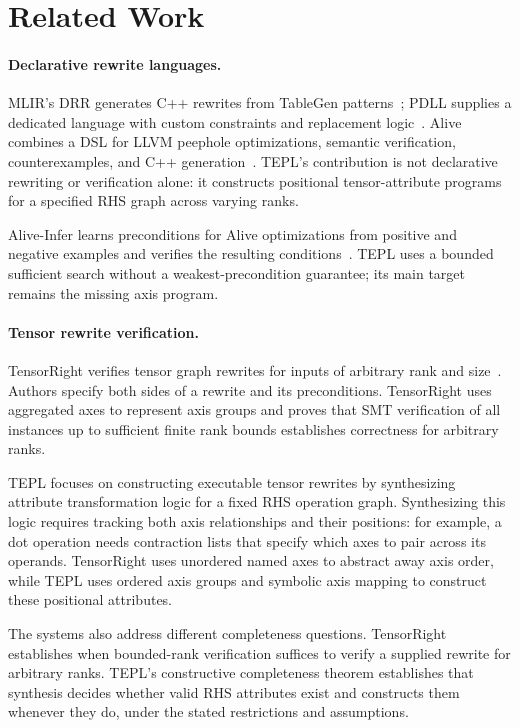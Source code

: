 \section{Related Work}
\label{sec:related-work}

\paragraph{Declarative rewrite languages.}
MLIR's DRR generates C++ rewrites from TableGen patterns~\cite{mlir-drr};
PDLL supplies a dedicated language with custom constraints and replacement
logic~\cite{mlir-pdll}. Alive combines a DSL for LLVM peephole optimizations,
semantic verification, counterexamples, and C++ generation~\cite{alive}.
TEPL's contribution is not declarative rewriting or verification alone:
it constructs positional tensor-attribute programs for a specified RHS
graph across varying ranks.

Alive-Infer learns preconditions for Alive optimizations from positive
and negative examples and verifies the resulting conditions~\cite{alive-infer}.
TEPL uses a bounded sufficient search without a weakest-precondition
guarantee; its main target remains the missing axis program.

\paragraph{Tensor rewrite verification.}
TensorRight verifies tensor graph rewrites for inputs of arbitrary rank and
size~\cite{tensorright}. Authors specify both sides of a rewrite and its
preconditions. TensorRight uses aggregated axes to represent axis groups and
proves that SMT verification of all instances up to sufficient finite rank
bounds establishes correctness for arbitrary ranks.

TEPL focuses on constructing executable tensor rewrites by synthesizing
attribute transformation logic for a fixed RHS operation graph. Synthesizing
this logic requires tracking both axis relationships and their positions:
for example, a dot operation needs contraction lists that specify which axes
to pair across its operands. TensorRight uses unordered named axes to
abstract away axis order, while TEPL uses ordered axis
groups and symbolic axis mapping to construct these positional attributes.

The systems also address different completeness questions. TensorRight
establishes when bounded-rank verification suffices to verify a supplied
rewrite for arbitrary ranks. TEPL's constructive completeness theorem
establishes that synthesis decides whether valid RHS attributes exist and
constructs them whenever they do, under the stated restrictions and
assumptions.

